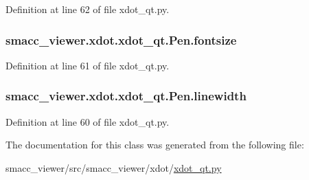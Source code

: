 Definition at line 62 of file xdot\+\_\+qt.\+py.

\subsubsection[{\texorpdfstring{fontsize}{fontsize}}]{\setlength{\rightskip}{0pt plus 5cm}smacc\+\_\+viewer.\+xdot.\+xdot\+\_\+qt.\+Pen.\+fontsize}\hypertarget{classsmacc__viewer_1_1xdot_1_1xdot__qt_1_1Pen_a4f68e32ace9fefc33958e0493282359b}{}\label{classsmacc__viewer_1_1xdot_1_1xdot__qt_1_1Pen_a4f68e32ace9fefc33958e0493282359b}


Definition at line 61 of file xdot\+\_\+qt.\+py.

\subsubsection[{\texorpdfstring{linewidth}{linewidth}}]{\setlength{\rightskip}{0pt plus 5cm}smacc\+\_\+viewer.\+xdot.\+xdot\+\_\+qt.\+Pen.\+linewidth}\hypertarget{classsmacc__viewer_1_1xdot_1_1xdot__qt_1_1Pen_ae52fd56e1c80b8b8f22c91492fc62752}{}\label{classsmacc__viewer_1_1xdot_1_1xdot__qt_1_1Pen_ae52fd56e1c80b8b8f22c91492fc62752}


Definition at line 60 of file xdot\+\_\+qt.\+py.



The documentation for this class was generated from the following file\+:\begin{DoxyCompactItemize}
\item 
smacc\+\_\+viewer/src/smacc\+\_\+viewer/xdot/\hyperlink{xdot__qt_8py}{xdot\+\_\+qt.\+py}\end{DoxyCompactItemize}
